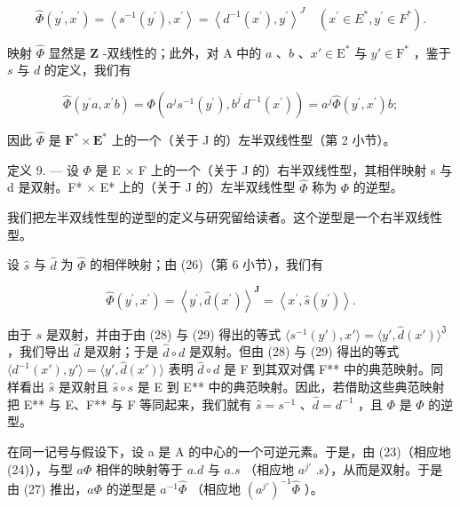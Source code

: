 \[
\hat {\Phi} (y ^ {\prime}, x ^ {\prime}) = \left\langle s ^ {- 1} (y ^ {\prime}), x ^ {\prime} \right\rangle = \left\langle d ^ {- 1} (x ^ {\prime}), y ^ {\prime} \right\rangle^ {J} \quad (x ^ {\prime} \in E ^ {*}, y ^ {\prime} \in F ^ {*}).\tag{28}
\]

映射 \(\hat{\Phi}\) 显然是 \(\mathbf{Z}\) -双线性的；此外，对 A 中的 \(a\) 、\(b\) 、\(x' \in \mathrm{E}^*\) 与 \(y' \in \mathrm{F}^*\) ，鉴于 \(s\) 与 \(d\) 的定义，我们有

\[
\widehat {\Phi} (y ^ {\prime} a, x ^ {\prime} b) = \Phi (a ^ {j} s ^ {- 1} (y ^ {\prime}), b ^ {j ^ {\prime}} d ^ {- 1} (x ^ {\prime})) = a ^ {j} \widehat {\Phi} (y ^ {\prime}, x ^ {\prime}) b;
\]

因此 \(\hat{\Phi}\) 是 \(\mathbf{F}^{*} \times \mathbf{E}^{*}\) 上的一个（关于 J 的）左半双线性型（第 2 小节）。

定义 9. --- 设 \(\Phi\) 是 E × F 上的一个（关于 J 的）右半双线性型，其相伴映射 s 与 d 是双射。F* × E* 上的（关于 J 的）左半双线性型 \(\hat{\Phi}\) 称为 \(\Phi\) 的逆型。

我们把左半双线性型的逆型的定义与研究留给读者。这个逆型是一个右半双线性型。

设 \(\hat{s}\) 与 \(\hat{d}\) 为 \(\hat{\Phi}\) 的相伴映射；由 (26)（第 6 小节），我们有

\[
\hat {\Phi} (y ^ {\prime}, x ^ {\prime}) = \left\langle y ^ {\prime}, \hat {d} (x ^ {\prime}) \right\rangle^ {\mathbf {J}} = \left\langle x ^ {\prime}, \hat {s} (y ^ {\prime}) \right\rangle .\tag{29}
\]

由于 \(s\) 是双射，并由于由 (28) 与 (29) 得出的等式 \(\langle s^{-1}(y'), x'\rangle = \langle y', \hat{d}(x') \rangle^{\mathfrak{J}}\) ，我们导出 \(\hat{d}\) 是双射；于是 \(\hat{d} \circ d\) 是双射。但由 (28) 与 (29) 得出的等式 \(\langle d^{-1}(x'), y' \rangle = \langle y', \hat{d}(x') \rangle\) 表明 \(\hat{d} \circ d\) 是 F 到其双对偶 F** 中的典范映射。同样看出 \(\hat{s}\) 是双射且 \(\hat{s} \circ s\) 是 E 到 E** 中的典范映射。因此，若借助这些典范映射把 E** 与 E、F** 与 F 等同起来，我们就有 \(\hat{s} = s^{-1}\) 、\(\hat{d} = d^{-1}\) ，且 \(\Phi\) 是 \(\hat{\Phi}\) 的逆型。

在同一记号与假设下，设 a 是 A 的中心的一个可逆元素。于是，由 (23)（相应地 (24)），与型 \(a\Phi\) 相伴的映射等于 \(a.d\) 与 \(a.s\) （相应地 \(a^{j'}\) .s），从而是双射。于是由 (27) 推出，\(a\Phi\) 的逆型是 \(a^{-1}\widehat{\Phi}\) （相应地 \((a^{j'})^{-1}\widehat{\Phi}\) ）。


